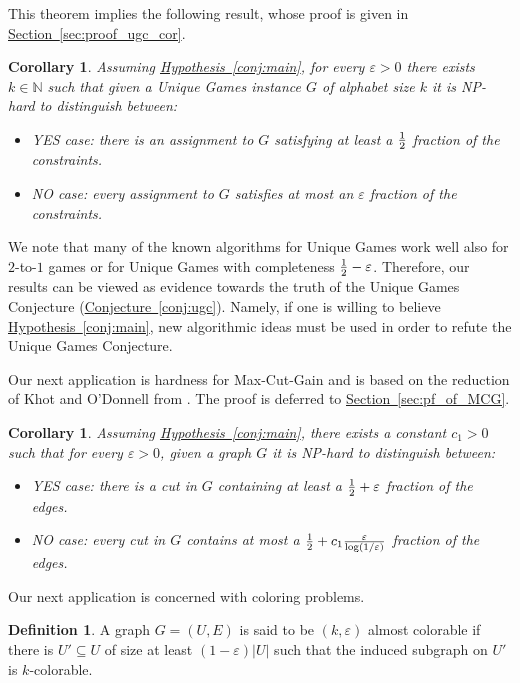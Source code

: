 \documentclass[11pt]{article}
\numberwithin{equation}{section}
\newtheorem{corollary}[theorem]{Corollary}
\theoremstyle{definition}
\newtheorem{definition}[theorem]{Definition}
\theoremstyle{plain}
\newcommand{\expref}[2]{\hyperref[#2]{#1~\ref{#2}}}
\newcommand\card[1]{\left| {#1} \right|}
\newcommand\half{{1\over2}}
\newcommand\eps{\varepsilon}
\begin{document}
This %
theorem
implies the following result, whose proof
%
is given in
\expref{Section}{sec:proof_ugc_cor}.
\begin{corollary}\label{corr:UG}
Assuming \expref{Hypothesis}{conj:main}, for every $\eps>0$ there exists $k\in \mathbb{N}$ such that
given a Unique Games instance $G$ of alphabet size $k$ it is NP-hard to distinguish between:
\begin{itemize}
  \item YES case: there is an assignment to $G$ satisfying at least
  a %
  $\half$ fraction of the constraints.
  \item NO case: every assignment to $G$ satisfies at most
  an %
  $\eps$ fraction of the constraints.
\end{itemize}
\end{corollary}


We note that many of the known algorithms for Unique Games work well also for $2$-to-$1$ games or for Unique Games with
completeness $\half-\eps$. Therefore, our results can be viewed as evidence towards the truth of the Unique Games Conjecture
(\expref{Conjecture}{conj:ugc}). Namely, if one is willing to believe \expref{Hypothesis}{conj:main}, new algorithmic ideas must be used
in order to refute the Unique Games Conjecture.


Our next application is hardness for Max-Cut-Gain and is based on the reduction of Khot and
O'Donnell
%
from \cite{KhotOdonell}.
The proof is deferred to \expref{Section}{sec:pf_of_MCG}.
\begin{corollary}\label{cor:MCG}
Assuming \expref{Hypothesis}{conj:main},
there exists a constant $c_1>0$ such that for every $\eps>0$,
given a graph $G$ it is NP-hard
to distinguish between:
\begin{itemize}
  \item YES case: there is a cut in $G$ containing at least a $\half+\eps$ fraction of the edges.
  \item NO case: every cut in $G$ contains at most a $\half+c_1\frac{\eps}{\log(1/\eps)}$ fraction of the edges.
\end{itemize}
\end{corollary}

Our next application is concerned with coloring problems.
\begin{definition}
A graph $G=(U,E)$ is said to be $(k,\eps)$ almost colorable if there is $U'\subseteq U$ of size at least
$(1-\eps)\card{U}$ such that the induced subgraph on $U'$ is $k$-colorable.
\end{definition}
\end{document}
